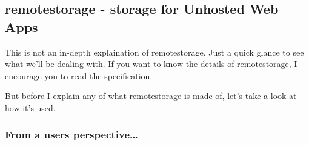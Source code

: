 \documentclass[11pt]{article}
\begin{document}
\subsection{remotestorage - storage for Unhosted Web Apps}
\label{sec-1-3}

   This is not an in-depth explaination of remotestorage. Just a quick glance to see what we'll be dealing with. If you want to know the details of remotestorage, I encourage you to read \href{http://www.w3.org/community/unhosted/wiki/RemoteStorage-2012.04}{the specification}.

   But before I explain any of what remotestorage is made of, let's take a look at how it's used.
\subsubsection{From a users perspective\ldots{}}
\label{sec-1-3-1}
\end{document}
